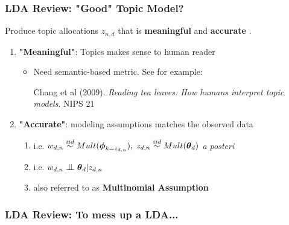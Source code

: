 \documentclass{beamer}
\newcommand{\indep}{\mathrel{\text{\scalebox{1.07}{$\perp\mkern-10mu\perp$}}}}
\begin{document}
\begin{frame}
\frametitle{LDA Review: "Good" Topic Model?}
Produce topic allocations $z_{n,d}$ that is \textbf{meaningful} and \textbf{accurate} .
\begin{enumerate}
\item \textbf{"Meaningful"}: Topics makes sense to human reader
\begin{itemize}
\item Need semantic-based metric. See for example:

Chang et al (2009). \textit{Reading tea leaves: How humans interpret
topic models}. NIPS 21
\end{itemize}


\item \textbf{"Accurate"}: modeling assumptions matches the observed data
\begin{enumerate}
\item i.e. $w_{d, n} \stackrel{iid}{\sim} Mult(\boldsymbol{\phi}_{k = z_{d, n}}), 
\;
z_{d, n}\stackrel{iid}{\sim} Mult(\boldsymbol{\theta}_d)$ \textit{a posteri}
\item i.e. $w_{d, n} \indep \btheta_d | z_{d, n}$ 
\item also referred to as \textbf{Multinomial Assumption}
\end{enumerate}
\end{enumerate}
\end{frame}


\begin{frame}
\frametitle{LDA Review: To mess up a LDA...}
    \begin{figure}
      \centering
    \end{figure}

\end{frame}
\end{document}
